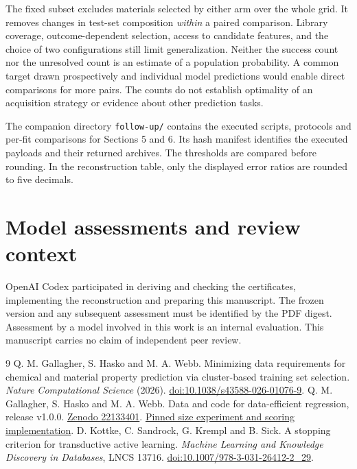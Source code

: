 \documentclass[11pt]{article}
\begin{document}
The fixed subset excludes materials selected by either arm over the whole grid. It removes changes in test-set composition \emph{within} a paired comparison. Library coverage, outcome-dependent selection, access to candidate features, and the choice of two configurations still limit generalization. Neither the success count nor the unresolved count is an estimate of a population probability. A common target drawn prospectively and individual model predictions would enable direct comparisons for more pairs. The counts do not establish optimality of an acquisition strategy or evidence about other prediction tasks.

The companion directory \texttt{follow-up/} contains the executed scripts, protocols and per-fit comparisons for Sections 5 and 6. Its hash manifest identifies the executed payloads and their returned archives. The thresholds are compared before rounding. In the reconstruction table, only the displayed error ratios are rounded to five decimals.

\section*{Model assessments and review context}
OpenAI Codex participated in deriving and checking the certificates, implementing the reconstruction and preparing this manuscript. The frozen version and any subsequent assessment must be identified by the PDF digest. Assessment by a model involved in this work is an internal evaluation. This manuscript carries no claim of independent peer review.

\begin{thebibliography}{9}
 Q. M. Gallagher, S. Hasko and M. A. Webb. Minimizing data requirements for chemical and material property prediction via cluster-based training set selection. \emph{Nature Computational Science} (2026). \href{https://doi.org/10.1038/s43588-026-01076-9}{doi:10.1038/s43588-026-01076-9}.
 Q. M. Gallagher, S. Hasko and M. A. Webb. Data and code for data-efficient regression, release v1.0.0. \href{https://doi.org/10.5281/zenodo.22133401}{Zenodo 22133401}. \href{https://github.com/webbtheosim/data-efficient-regression/tree/631296b91a0b2de790de4f4b5cb563f223e2f66b/size}{Pinned size experiment and scoring implementation}.
 D. Kottke, C. Sandrock, G. Krempl and B. Sick. A stopping criterion for transductive active learning. \emph{Machine Learning and Knowledge Discovery in Databases}, LNCS 13716. \href{https://doi.org/10.1007/978-3-031-26412-2_29}{doi:10.1007/978-3-031-26412-2\_29}.
\end{thebibliography}
\end{document}
